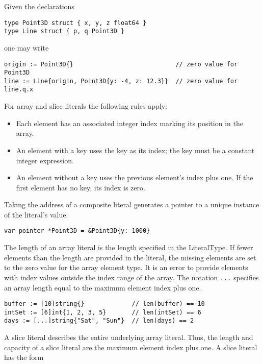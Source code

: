 Given the declarations

\begin{Verbatim}[frame=single]
type Point3D struct { x, y, z float64 }
type Line struct { p, q Point3D }
\end{Verbatim}

one may write

\begin{Verbatim}[frame=single]
origin := Point3D{}                            // zero value for Point3D
line := Line{origin, Point3D{y: -4, z: 12.3}}  // zero value for line.q.x
\end{Verbatim}

For array and slice literals the following rules apply:

\begin{itemize}
\item
  Each element has an associated integer index marking its position in
  the array.
\item
  An element with a key uses the key as its index; the key must be a
  constant integer expression.
\item
  An element without a key uses the previous element's index plus one.
  If the first element has no key, its index is zero.
\end{itemize}

Taking the address of a composite literal generates a pointer to a
unique instance of the literal's value.

\begin{Verbatim}[frame=single]
var pointer *Point3D = &Point3D{y: 1000}
\end{Verbatim}

The length of an array literal is the length specified in the
LiteralType. If fewer elements than the length are provided in the
literal, the missing elements are set to the zero value for the array
element type. It is an error to provide elements with index values
outside the index range of the array. The notation \texttt{...}
specifies an array length equal to the maximum element index plus one.

\begin{Verbatim}[frame=single]
buffer := [10]string{}             // len(buffer) == 10
intSet := [6]int{1, 2, 3, 5}       // len(intSet) == 6
days := [...]string{"Sat", "Sun"}  // len(days) == 2
\end{Verbatim}

A slice literal describes the entire underlying array literal. Thus, the
length and capacity of a slice literal are the maximum element index
plus one. A slice literal has the form

